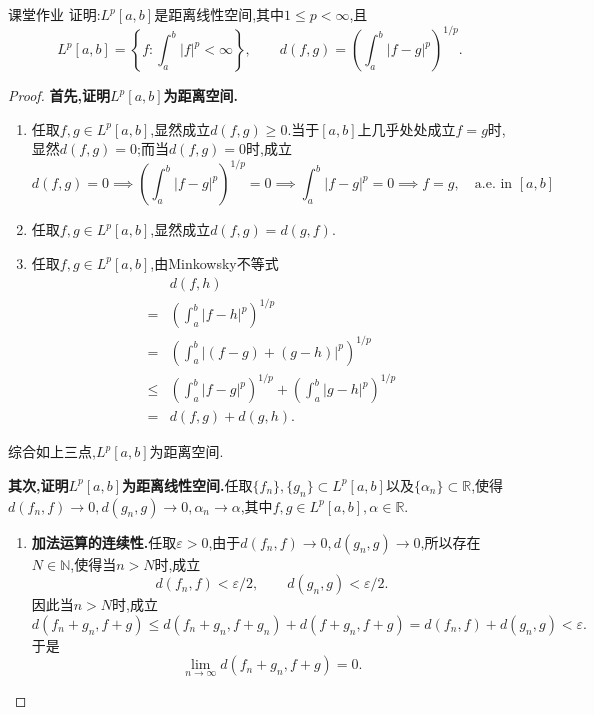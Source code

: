 \documentclass[lang = cn, scheme = chinese]{elegantbook}
\newcommand{\R}{\mathbb{R}}            %
\begin{document}
	\begin{proposition}{课堂作业}
		证明:$L^p[a,b]$是距离线性空间,其中$1\le p<\infty$,且
		$$
		L^p[a,b]=\left\{f:\int_a^b|f|^p<\infty\right\},
		\qquad  d(f,g)=\left(\int_a^b|f-g|^p\right)^{1/p}.
		$$
	\end{proposition}
	
	\begin{proof}
		{\bf 首先,证明$L^p[a,b]$为距离空间.}
		
		\begin{enumerate}
			
			\item 任取$f,g\in L^p[a,b]$,显然成立$d(f,g)\ge 0$.当于$[a,b]$上几乎处处成立$f=g$时,显然$d(f,g)=0$;而当$d(f,g)=0$时,成立
			$$
			d(f,g)=0\implies 
			\left(\int_a^b|f-g|^p\right)^{1/p}=0\implies
			\int_a^b|f-g|^p=0\implies f=g,\quad\text{a.e. in }[a,b]
			$$
			
			\item 任取$f,g\in L^p[a,b]$,显然成立$d(f,g) = d(g,f)$.
			
			\item 任取$f,g\in L^p[a,b]$,由Minkowsky不等式
			\begin{align*}
				&d(f,h)\\
				=&\left(\int_a^b|f-h|^p\right)^{1/p}\\
				=&\left(\int_a^b|(f-g)+(g-h)|^p\right)^{1/p}\\
				\le&\left(\int_a^b|f-g|^p\right)^{1/p}+\left(\int_a^b|g-h|^p\right)^{1/p}\\
				=&d(f,g)+d(g,h).
			\end{align*}
			
		\end{enumerate}
		
		综合如上三点,$L^p[a,b]$为距离空间.
		
		{\bf 其次,证明$L^p[a,b]$为距离线性空间.}任取$\{f_n\},\{g_n\}\subset L^p[a,b]$以及$\{\alpha_n\}\subset \R$,使得$d(f_n,f)\to 0,d(g_n,g)\to 0,\alpha_n\to \alpha$,其中$f,g\in L^p[a,b],\alpha\in\R$.
		
		\begin{enumerate}
			
			\item {\bf 加法运算的连续性.}任取$\varepsilon>0$,由于$d(f_n,f)\to 0,d(g_n,g)\to 0$,所以存在$N\in\mathbb{N}$,使得当$n>N$时,成立
			$$
			d(f_n,f)<\varepsilon/2,\qquad 
			d(g_n,g)<\varepsilon/2.
			$$
			因此当$n>N$时,成立
			$$
			d(f_n+g_n,f+g)\le d(f_n+g_n,f+g_n)+d(f+g_n,f+g)=d(f_n,f)+d(g_n,g)<\varepsilon.
			$$
			于是
			$$
			\lim_{n\to\infty}d(f_n+g_n,f+g)=0.
			$$
			

\end{enumerate}
\end{proof}
\end{document}
